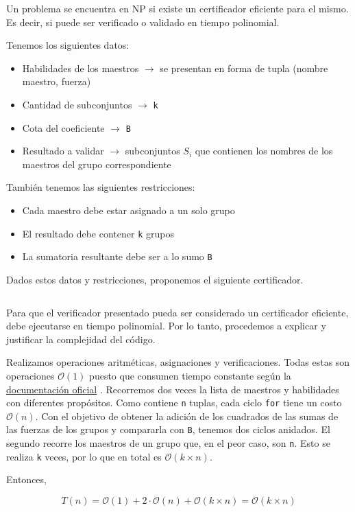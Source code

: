 \documentclass{article}
\newcommand{\docuPy}{%
  {\href{https://wiki.python.org/moin/TimeComplexity}{documentación oficial}}
  }%
\begin{document}
Un problema se encuentra en NP si existe un certificador eficiente para el mismo. Es decir, si puede ser verificado o validado en tiempo polinomial. 

Tenemos los siguientes datos:
\begin{itemize}
    \item Habilidades de los maestros $\rightarrow$ se presentan en forma de tupla (nombre maestro, fuerza)
    \item Cantidad de subconjuntos $\rightarrow$ \texttt{k}
    \item Cota del coeficiente $\rightarrow$ \texttt{B}
    \item Resultado a validar $\rightarrow$ subconjuntos $S_i$ que contienen los nombres de los maestros del grupo correspondiente
\end{itemize}

También tenemos las siguientes restricciones:
\begin{itemize}
    \item Cada maestro debe estar asignado a un solo grupo
    \item El resultado debe contener \texttt{k} grupos
    \item La sumatoria resultante debe ser a lo sumo \texttt{B} 
\end{itemize}

Dados estos datos y restricciones, proponemos el siguiente certificador.
\inputminted[linenos, firstline=1, lastline=31]{python}{codigo/certificador_eficiente.py}

Para que el verificador presentado pueda ser considerado un certificador eficiente, debe ejecutarse en tiempo polinomial. Por lo tanto, procedemos a explicar y justificar la complejidad del código.

Realizamos operaciones aritméticas, asignaciones y verificaciones. Todas estas son operaciones $\mathcal{O}(1)$ puesto que consumen tiempo constante según la \docuPy. Recorremos dos veces la lista de maestros y habilidades con diferentes propósitos. Como contiene \texttt{n} tuplas, cada ciclo \texttt{for} tiene un costo $\mathcal{O}(n)$. Con el objetivo de obtener la adición de los cuadrados de las sumas de las fuerzas de los grupos y compararla con \texttt{B}, tenemos dos ciclos anidados. El segundo recorre los maestros de un grupo que, en el peor caso, son \texttt{n}. Esto se realiza \texttt{k} veces, por lo que en total es $\mathcal{O}(k \times n)$.

Entonces,

$$
T(n) = \mathcal{O}(1) + 2 \cdot \mathcal{O}(n) + \mathcal{O}(k \times n) = \mathcal{O}(k \times n)  
$$
\end{document}
